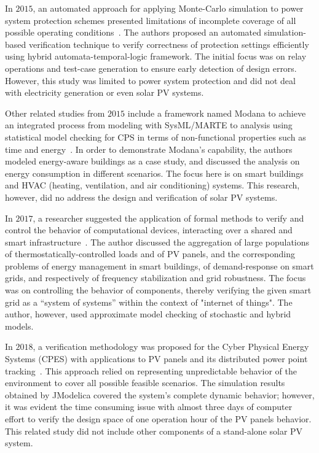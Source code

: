 In $2015$, an automated approach for applying Monte-Carlo simulation to power system protection schemes presented limitations of incomplete coverage of all possible operating conditions~\cite{Sengupta2015}. The authors proposed an automated simulation-based verification technique to verify correctness of protection settings efficiently using hybrid automata-temporal-logic framework. The initial focus was on relay operations and test-case generation to ensure early detection of design errors. However, this study was limited to power system protection and did not deal with electricity generation or even solar PV systems.

Other related studies from $2015$ include a framework named Modana to achieve an integrated process from modeling with SysML/MARTE to analysis using statistical model checking for CPS in terms of non-functional properties such as time and energy~\cite{Cheng2015}. In order to demonstrate Modana's capability, the authors modeled energy-aware buildings as a case study, and discussed the analysis on energy consumption in different scenarios. The focus here is on smart buildings and HVAC (heating, ventilation, and air conditioning) systems. This research, however, did no address the design and verification of solar PV systems. 
 
In $2017$, a researcher suggested the application of formal methods to verify and control the behavior of computational devices, interacting over a shared and smart infrastructure~\cite{Abate2017}. The author discussed the aggregation of large populations of thermostatically-controlled loads and of PV panels, and the corresponding problems of energy management in smart buildings, of demand-response on smart grids, and respectively of frequency stabilization and grid robustness. The focus was on controlling the behavior of components, thereby verifying the given smart grid as a ``system of systems'' within the context of "internet of things". The author, however, used approximate model checking of stochastic and hybrid models.

In $2018$, a verification methodology was proposed for the Cyber Physical Energy Systems (CPES) with applications to PV panels and its distributed power point tracking~\cite{Driouich2018}. This approach relied on representing unpredictable behavior of the environment to cover all possible feasible scenarios. The simulation results obtained by JModelica covered the system's complete dynamic behavior; however, it was evident the time consuming issue with almost three days of computer effort to verify the design space of one operation hour of the PV panels behavior. This related study did not include other components of a stand-alone solar PV system.

